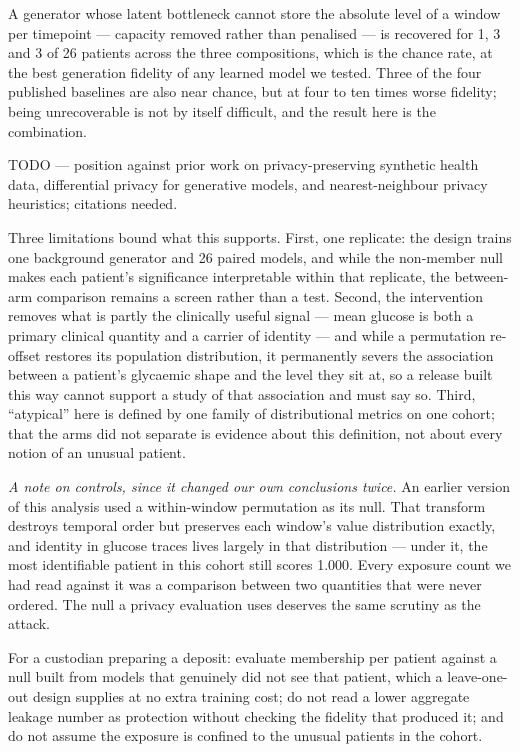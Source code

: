 \documentclass[pdflatex,sn-nature]{sn-jnl}
\theoremstyle{thmstyleone}
\begin{document}
A generator whose latent bottleneck cannot store the absolute level of a window
per timepoint --- capacity removed rather than penalised --- is recovered for 1,
3 and 3 of 26 patients across the three compositions, which is the chance rate,
at the best generation fidelity of any learned model we tested. Three of the
four published baselines are also near chance, but at four to ten times worse
fidelity; being unrecoverable is not by itself difficult, and the result here is
the combination.

TODO --- position against prior work on privacy-preserving synthetic health
data, differential privacy for generative models, and nearest-neighbour privacy
heuristics; citations needed.

Three limitations bound what this supports. First, one replicate: the design
trains one background generator and 26 paired models, and while the non-member
null makes each patient's significance interpretable within that replicate, the
between-arm comparison remains a screen rather than a test. Second, the
intervention removes what is partly the clinically useful signal --- mean
glucose is both a primary clinical quantity and a carrier of identity --- and
while a permutation re-offset restores its population distribution, it
permanently severs the association between a patient's glycaemic shape and the
level they sit at, so a release built this way cannot support a study of that
association and must say so. Third, ``atypical'' here is defined by one family
of distributional metrics on one cohort; that the arms did not separate is
evidence about this definition, not about every notion of an unusual patient.

\emph{A note on controls, since it changed our own conclusions twice.} An
earlier version of this analysis used a within-window permutation as its null.
That transform destroys temporal order but preserves each window's value
distribution exactly, and identity in glucose traces lives largely in that
distribution --- under it, the most identifiable patient in this cohort still
scores 1.000. Every exposure count we had read against it was a comparison
between two quantities that were never ordered. The null a privacy evaluation
uses deserves the same scrutiny as the attack.

For a custodian preparing a deposit: evaluate membership per patient against a
null built from models that genuinely did not see that patient, which a
leave-one-out design supplies at no extra training cost; do not read a lower
aggregate leakage number as protection without checking the fidelity that
produced it; and do not assume the exposure is confined to the unusual patients
in the cohort.
\end{document}
